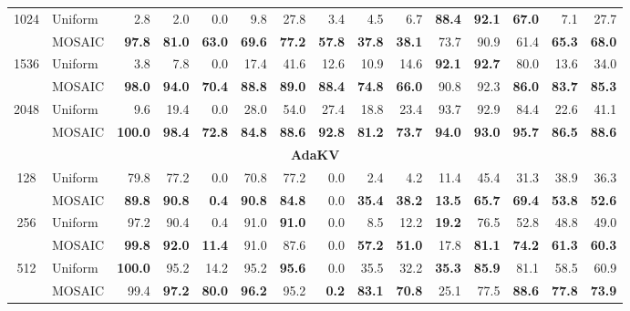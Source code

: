 \begin{table}[tp]
\begin{tabular}{@{} c l rrrrrrrrrrrrr @{}}
    \cmidrule(l){1-15}
    \multirow{2}{*}{1024} & Uniform & 2.8 & 2.0 & 0.0 & 9.8 & 27.8 & 3.4 & 4.5 & 6.7 & \textbf{88.4} & \textbf{92.1} & \textbf{67.0} & 7.1 & 27.7 \\
     & MOSAIC & \textbf{97.8} & \textbf{81.0} & \textbf{63.0} & \textbf{69.6} & \textbf{77.2} & \textbf{57.8} & \textbf{37.8} & \textbf{38.1} & 73.7 & 90.9 & 61.4 & \textbf{65.3} & \textbf{68.0} \\
    \cmidrule(l){1-15}
    \multirow{2}{*}{1536} & Uniform & 3.8 & 7.8 & 0.0 & 17.4 & 41.6 & 12.6 & 10.9 & 14.6 & \textbf{92.1} & \textbf{92.7} & 80.0 & 13.6 & 34.0 \\
     & MOSAIC & \textbf{98.0} & \textbf{94.0} & \textbf{70.4} & \textbf{88.8} & \textbf{89.0} & \textbf{88.4} & \textbf{74.8} & \textbf{66.0} & 90.8 & 92.3 & \textbf{86.0} & \textbf{83.7} & \textbf{85.3} \\
    \cmidrule(l){1-15}
    \multirow{2}{*}{2048} & Uniform & 9.6 & 19.4 & 0.0 & 28.0 & 54.0 & 27.4 & 18.8 & 23.4 & 93.7 & 92.9 & 84.4 & 22.6 & 41.1 \\
     & MOSAIC & \textbf{100.0} & \textbf{98.4} & \textbf{72.8} & \textbf{84.8} & \textbf{88.6} & \textbf{92.8} & \textbf{81.2} & \textbf{73.7} & \textbf{94.0} & \textbf{93.0} & \textbf{95.7} & \textbf{86.5} & \textbf{88.6} \\
    \midrule
    \multicolumn{15}{c}{\textbf{AdaKV}} \\
    \midrule
    \multirow{2}{*}{128} & Uniform & 79.8 & 77.2 & 0.0 & 70.8 & 77.2 & 0.0 & 2.4 & 4.2 & 11.4 & 45.4 & 31.3 & 38.9 & 36.3 \\
     & MOSAIC & \textbf{89.8} & \textbf{90.8} & \textbf{0.4} & \textbf{90.8} & \textbf{84.8} & 0.0 & \textbf{35.4} & \textbf{38.2} & \textbf{13.5} & \textbf{65.7} & \textbf{69.4} & \textbf{53.8} & \textbf{52.6} \\
    \cmidrule(l){1-15}
    \multirow{2}{*}{256} & Uniform & 97.2 & 90.4 & 0.4 & 91.0 & \textbf{91.0} & 0.0 & 8.5 & 12.2 & \textbf{19.2} & 76.5 & 52.8 & 48.8 & 49.0 \\
     & MOSAIC & \textbf{99.8} & \textbf{92.0} & \textbf{11.4} & 91.0 & 87.6 & 0.0 & \textbf{57.2} & \textbf{51.0} & 17.8 & \textbf{81.1} & \textbf{74.2} & \textbf{61.3} & \textbf{60.3} \\
    \cmidrule(l){1-15}
    \multirow{2}{*}{512} & Uniform & \textbf{100.0} & 95.2 & 14.2 & 95.2 & \textbf{95.6} & 0.0 & 35.5 & 32.2 & \textbf{35.3} & \textbf{85.9} & 81.1 & 58.5 & 60.9 \\
     & MOSAIC & 99.4 & \textbf{97.2} & \textbf{80.0} & \textbf{96.2} & 95.2 & \textbf{0.2} & \textbf{83.1} & \textbf{70.8} & 25.1 & 77.5 & \textbf{88.6} & \textbf{77.8} & \textbf{73.9} \\

\end{tabular}
\end{table}

